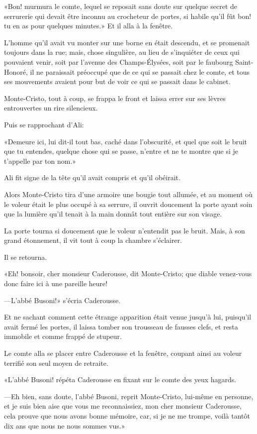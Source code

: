 «Bon! murmura le comte, lequel se reposait sans doute sur quelque secret de serrurerie qui devait être inconnu au crocheteur de portes, si habile qu'il fût bon! tu en as pour quelques minutes.» Et il alla à la fenêtre. 

L'homme qu'il avait vu monter sur une borne en était descendu, et se promenait toujours dans la rue; mais, chose singulière, au lieu de s'inquiéter de ceux qui pouvaient venir, soit par l'avenue des Champs-Élysées, soit par le faubourg Saint-Honoré, il ne paraissait préoccupé que de ce qui se passait chez le comte, et tous ses mouvements avaient pour but de voir ce qui se passait dans le cabinet. 

Monte-Cristo, tout à coup, se frappa le front et laissa errer sur ses lèvres entrouvertes un rire silencieux. 

Puis se rapprochant d'Ali: 

«Demeure ici, lui dit-il tout bas, caché dans l'obscurité, et quel que soit le bruit que tu entendes, quelque chose qui se passe, n'entre et ne te montre que si je t'appelle par ton nom.» 

Ali fit signe de la tête qu'il avait compris et qu'il obéirait. 

Alors Monte-Cristo tira d'une armoire une bougie tout allumée, et au moment où le voleur était le plus occupé à sa serrure, il ouvrit doucement la porte ayant soin que la lumière qu'il tenait à la main donnât tout entière sur son visage. 

La porte tourna si doucement que le voleur n'entendit pas le bruit. Mais, à son grand étonnement, il vit tout à coup la chambre s'éclairer. 

Il se retourna. 

«Eh! bonsoir, cher monsieur Caderousse, dit Monte-Cristo; que diable venez-vous donc faire ici à une pareille heure! 

—L'abbé Busoni!» s'écria Caderousse. 

Et ne sachant comment cette étrange apparition était venue jusqu'à lui, puisqu'il avait fermé les portes, il laissa tomber son trousseau de fausses clefs, et resta immobile et comme frappé de stupeur. 

Le comte alla se placer entre Caderousse et la fenêtre, coupant ainsi au voleur terrifié son seul moyen de retraite. 

«L'abbé Busoni! répéta Caderousse en fixant sur le comte des yeux hagards. 

—Eh bien, sans doute, l'abbé Busoni, reprit Monte-Cristo, lui-même en personne, et je suis bien aise que vous me reconnaissiez, mon cher monsieur Caderousse, cela prouve que nous avons bonne mémoire, car, si je ne me trompe, voilà tantôt dix ans que nous ne nous sommes vus.» 

